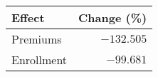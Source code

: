 \begin{longtable}{lr}
\toprule
Effect & Change (\%) \\ 
\midrule\addlinespace[2.5pt]
Premiums & $-132.505$ \\ 
Enrollment & $-99.681$ \\ 
\bottomrule
\end{longtable}

